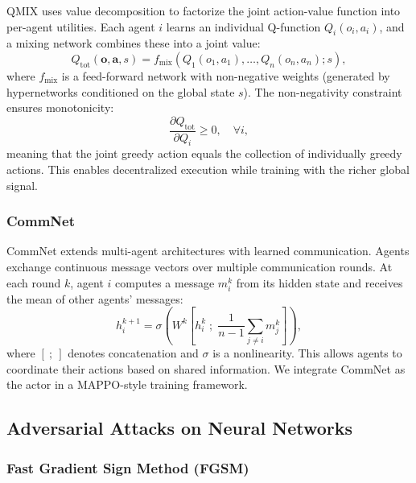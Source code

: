 \documentclass[12pt,a4paper]{article}
\begin{document}
QMIX \citep{rashid2018qmix} uses value decomposition to factorize the joint action-value function into per-agent utilities. Each agent $i$ learns an individual Q-function $Q_i(o_i, a_i)$, and a mixing network combines these into a joint value:
\begin{equation}
    Q_\text{tot}(\mathbf{o}, \mathbf{a}, s) = f_\text{mix}(Q_1(o_1, a_1), \ldots, Q_n(o_n, a_n); s),
\end{equation}
where $f_\text{mix}$ is a feed-forward network with non-negative weights (generated by hypernetworks conditioned on the global state $s$). The non-negativity constraint ensures monotonicity:
\begin{equation}
    \frac{\partial Q_\text{tot}}{\partial Q_i} \geq 0, \quad \forall i,
\end{equation}
meaning that the joint greedy action equals the collection of individually greedy actions. This enables decentralized execution while training with the richer global signal.

\subsubsection{CommNet}

CommNet \citep{sukhbaatar2016learning} extends multi-agent architectures with learned communication. Agents exchange continuous message vectors over multiple communication rounds. At each round $k$, agent $i$ computes a message $m_i^k$ from its hidden state and receives the mean of other agents' messages:
\begin{equation}
    h_i^{k+1} = \sigma\left(W^k \left[h_i^k \;;\; \frac{1}{n-1}\sum_{j \neq i} m_j^k\right]\right),
\end{equation}
where $[\ ;\ ]$ denotes concatenation and $\sigma$ is a nonlinearity. This allows agents to coordinate their actions based on shared information. We integrate CommNet as the actor in a MAPPO-style training framework.

\subsection{Adversarial Attacks on Neural Networks}

\subsubsection{Fast Gradient Sign Method (FGSM)}
\end{document}
